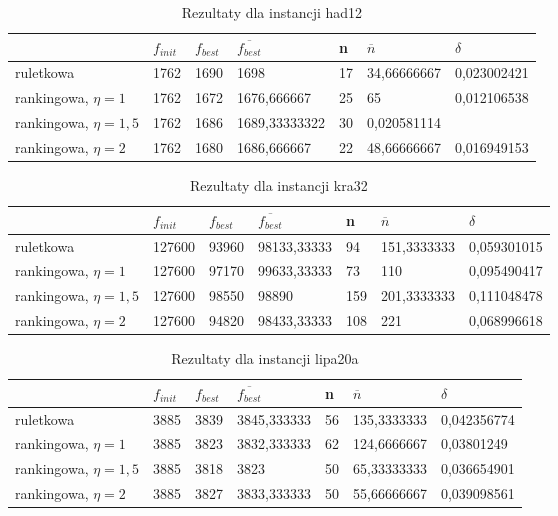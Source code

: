\begin{table}[H]
\label{T5_had12}
\begin{tabular}{l l l l l l l}
\hline
 & $f_{init}$ & $f_{best}$ & $\overline{f_{best}}$ & n & $\overline{n}$ & $\delta$ \\
\hline
ruletkowa & 1762 & 1690 & 1698 & 17 & 34,66666667 & 0,023002421\\
rankingowa, $\eta = 1$ & 1762 & 1672 & 1676,666667 & 25 & 65 & 0,012106538\\
rankingowa, $\eta = 1,5$ & 1762 & 1686 & 1689,33333322 & 30 & 0,020581114\\
rankingowa, $\eta = 2$ & 1762 & 1680 & 1686,666667 & 22 & 48,66666667 & 0,016949153\\
\hline
\end{tabular}
\caption{Rezultaty dla instancji had12}
\end{table}

\begin{table}[H]
\label{T5_kra32}
\begin{tabular}{l l l l l l l}
\hline
 & $f_{init}$ & $f_{best}$ & $\overline{f_{best}}$ & n & $\overline{n}$ & $\delta$ \\
\hline
ruletkowa & 127600 & 93960 & 98133,33333 & 94 & 151,3333333 & 0,059301015\\
rankingowa, $\eta = 1$ & 127600 & 97170 & 99633,33333 & 73 & 110 & 0,095490417\\
rankingowa, $\eta = 1,5$ & 127600 & 98550 & 98890 & 159 & 201,3333333 & 0,111048478\\
rankingowa, $\eta = 2$ & 127600 & 94820 & 98433,33333 & 108 & 221 & 0,068996618\\
\hline
\end{tabular}
\caption{Rezultaty dla instancji kra32}
\end{table}

\begin{table}[H]
\label{T5_lipa20a}
\begin{tabular}{l l l l l l l}
\hline
 & $f_{init}$ & $f_{best}$ & $\overline{f_{best}}$ & n & $\overline{n}$ & $\delta$ \\
\hline
ruletkowa & 3885 & 3839 & 3845,333333 & 56 & 135,3333333 & 0,042356774\\
rankingowa, $\eta = 1$ & 3885 & 3823 & 3832,333333 & 62 & 124,6666667 & 0,03801249\\
rankingowa, $\eta = 1,5$ & 3885 & 3818 & 3823 & 50 & 65,33333333 & 0,036654901\\
rankingowa, $\eta = 2$ & 3885 & 3827 & 3833,333333 & 50 & 55,66666667 & 0,039098561\\
\hline
\end{tabular}
\caption{Rezultaty dla instancji lipa20a}
\end{table}

